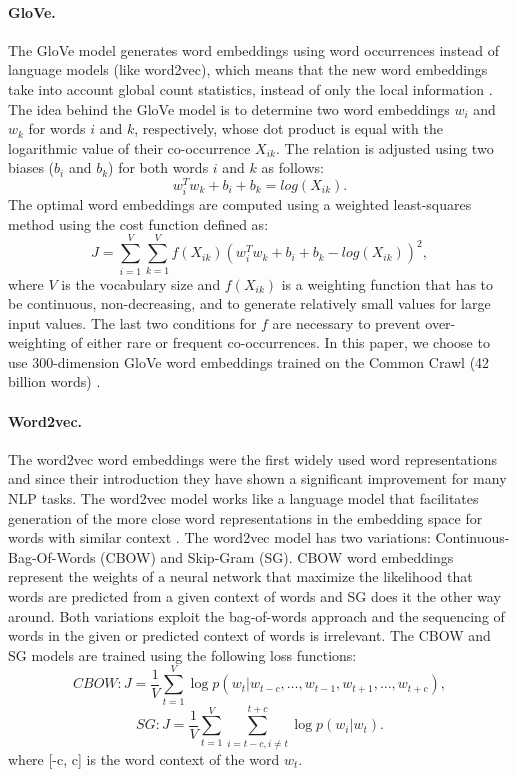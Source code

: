 \documentclass[hidelinks]{llncs}
\begin{document}
\paragraph{GloVe. }The GloVe model generates word embeddings using word occurrences instead of language models (like word2vec), which means that the new word embeddings take into account global count statistics, instead of only the local information \cite{pennington2014glove}. The idea behind the GloVe model is to determine two word embeddings $w_i$ and $w_k$ for words $i$ and $k$, respectively, whose dot product is equal with the logarithmic value of their co-occurrence $X_{ik}$. The relation is adjusted using two biases ($b_i$ and $b_k$) for both words $i$ and $k$ as follows:
\begin {equation}
\label{equation5}
{w^T_i}{w_k} + {b_i} + {b_k} = log({X_{ik}}).
\end {equation}
The optimal word embeddings are computed using a weighted least-squares method using the cost function defined as:
\begin {equation}
\label{equation6}
J = \sum_{i=1}^{V} {\sum_{k = 1}^{V}f(X_{ik})({w^T_i}{w_k} + {b_i} + {b_k} - log({X_{ik}}))^2},
\end {equation}
where $V$ is the vocabulary size and $f(X_{ik})$ is a weighting function that has to be continuous, non-decreasing, and to generate relatively small values for large input values. The last two conditions for $f$ are necessary to prevent over-weighting of either rare or frequent co-occurrences. In this paper, we choose to use 300-dimension GloVe word embeddings trained on the Common Crawl (42 billion words) \cite{pennington2014glove}.

\paragraph{Word2vec. }The word2vec word embeddings were the first widely used word representations and since their introduction they have shown a significant improvement for many NLP tasks. The word2vec model works like a language model that facilitates generation of the more close word representations in the embedding space for words with similar context \cite{mikolov2013distributed}. The word2vec model has two variations: Continuous-Bag-Of-Words (CBOW) and Skip-Gram (SG). CBOW word embeddings represent the weights of a neural network that maximize the likelihood that words are predicted from a given context of words and SG does it the other way around. Both variations exploit the bag-of-words approach and the sequencing of words in the given or predicted context of words is irrelevant. The CBOW and SG models are trained using the following loss functions:
\begin {equation}
\label{equation7}
CBOW: J = \frac{1}{V}\sum_{t=1}^{V}\log p(w_t|w_{t-c}, \dots, w_{t-1}, w_{t+1}, \dots, w_{t+c}),
\end {equation}
\begin {equation}
\label{equation8}
SG: J = \frac{1}{V}\sum_{t=1}^{V}\sum_{i=t-c,i\neq t}^{t+c} \log p(w_i|w_t).
\end {equation}
where [-c, c] is the word context of the word $w_t$.
\end{document}
